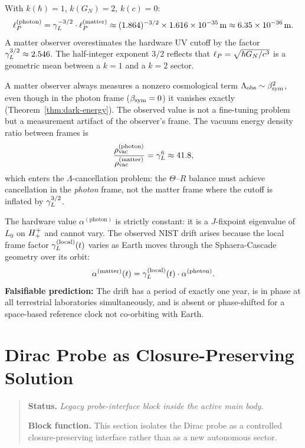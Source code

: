 \begin{theorem}\label{thm:planck-photon}
With $k(\hbar)=1$, $k(G_N)=2$, $k(c)=0$:
\[
  \ell_P^{(\mathrm{photon})}
  = \gamma_L^{-3/2}\cdot\ell_P^{(\mathrm{matter})}
  \approx (1.864)^{-3/2}\times 1.616\times10^{-35}\,\mathrm{m}
  \approx 6.35\times10^{-36}\,\mathrm{m}.
\]
A matter observer overestimates the hardware UV cutoff by the factor
$\gamma_L^{3/2}\approx 2.546$.
The half-integer exponent $3/2$ reflects that $\ell_P=\sqrt{\hbar G_N/c^3}$
is a geometric mean between a $k=1$ and a $k=2$ sector.
\end{theorem}

\begin{corollary}
A matter observer always measures a nonzero cosmological term
$\Lambda_{\mathrm{obs}}\sim\beta_{\mathrm{sym}}^2$, even though in the photon frame
($\beta_{\mathrm{sym}}=0$) it vanishes exactly
(Theorem~\ref{thm:dark-energy}).
The observed value is not a fine-tuning problem but a measurement
artifact of the observer's frame.
The vacuum energy density ratio between frames is
\[
  \frac{\rho_{\mathrm{vac}}^{(\mathrm{photon})}}
       {\rho_{\mathrm{vac}}^{(\mathrm{matter})}}
  = \gamma_L^6\approx 41.8,
\]
which enters the $\Lambda$-cancellation problem: the $\Theta$--$R$
balance must achieve cancellation in the \emph{photon} frame, not the
matter frame where the cutoff is inflated by $\gamma_L^{3/2}$.
\end{corollary}

\begin{corollary}
The hardware value $\alpha^{(\mathrm{photon})}$ is strictly constant:
it is a $J$-fixpoint eigenvalue of $L_0$ on $H^+_+$ and cannot vary.
The observed NIST drift arises because the local frame factor
$\gamma_L^{(\mathrm{local})}(t)$ varies as Earth moves through the
Sphaera-Cascade geometry over its orbit:
\[
  \alpha^{(\mathrm{matter})}(t)
  = \gamma_L^{(\mathrm{local})}(t)\cdot\alpha^{(\mathrm{photon})}.
\]
\textbf{Falsifiable prediction:} The drift has a period of exactly one
year, is in phase at all terrestrial laboratories simultaneously, and is
absent or phase-shifted for a space-based reference clock not co-orbiting
with Earth.
\end{corollary}


\section{Dirac Probe as Closure-Preserving Solution}
\begin{quote}\small
\noindent\textbf{Status.} \emph{Legacy probe-interface block inside the active main body.}\par
\noindent\textbf{Block function.} This section isolates the Dirac probe as a controlled closure-preserving interface rather than as a new autonomous sector.
\end{quote}
\label{sec:dirac-probe}

